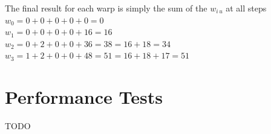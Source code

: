 The final result for each warp is simply the sum of the $w_{i\,u}$ at all steps\\
\(w_0 = 0 + 0 + 0 + 0 + 0 = 0\)\\
\(w_1 = 0 + 0 + 0 + 0 + 16 = 16\)\\
\(w_2 = 0 + 2 + 0 + 0 + 36 = 38 = 16+18=34\)\\
\(w_3 = 1 + 2 + 0 + 0 + 48 = 51 = 16+18+17=51\)\\


\section{Performance Tests}

TODO
